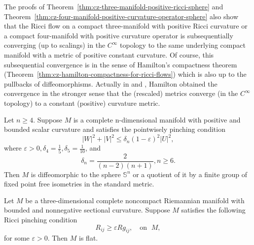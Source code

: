\begin{remark}
  \label{rem:cz-differentiable-sphere-subsequential-convergence}

The proofs of Theorem~\ref{thm:cz-three-manifold-positive-ricci-sphere} and Theorem~\ref{thm:cz-four-manifold-positive-curvature-operator-sphere} also show that the
Ricci flow on a compact three-manifold with positive Ricci
curvature or a compact four-manifold with positive curvature
operator is subsequentially converging (up to scalings) in the
$C^{\infty}$ topology to the same underlying compact manifold with
a metric of positive constant curvature. Of course, this
subsequential convergence is in the sense of Hamilton's
compactness theorem (Theorem~\ref{thm:cz-hamilton-compactness-for-ricci-flows}) which is also up to the
pullbacks of diffeomorphisms. Actually in \cite{Ha82} and
\cite{Ha86}, Hamilton obtained the convergence in the stronger
sense that the (rescaled) metrics converge (in the $C^{\infty}$
topology) to a constant (positive) curvature metric.
\end{remark}
\begin{theorem}
  \label{thm:cz-higher-dimensional-pointwise-pinched-sphere}

Let $n\ge4$. Suppose $M$ is a complete n-dimensional manifold with
positive and bounded scalar curvature and satisfies the
pointwisely pinching condition
$$
|W|^2+|V|^2\le\delta_n(1-\varepsilon)^2|U|^2,
$$
where $\varepsilon>0,\delta_4=\frac{1}{5},\delta_5=\frac{1}{10}$,
and
$$
\delta_n=\frac{2}{(n-2)(n+1)},n\ge 6.
$$
Then $M$ is diffeomorphic to the sphere $\mathbb{S}^n$ or a
quotient of it by a finite group of fixed point free isometries in
the standard metric.
\end{theorem}
\begin{theorem}
  \label{thm:cz-noncompact-three-manifold-ricci-pinching-flatness}

Let $M$ be a three-dimensional complete noncompact Riemannian
manifold with bounded and nonnegative sectional curvature. Suppose
$M$ satisfies the following Ricci pinching condition
$$
R_{ij}\ge \varepsilon Rg_{ij},\quad \text{on }\; M,
$$
for some $\varepsilon>0$. Then $M$ is flat.
\end{theorem}
